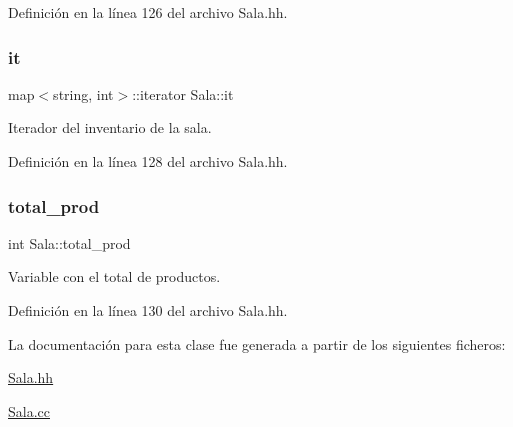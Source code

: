 Definición en la línea 126 del archivo Sala.\+hh.

\mbox{\label{class_sala_a1cc789ab041a9e3011f9eec9357e8fb0}} 
\subsubsection{\texorpdfstring{it}{it}}
{\footnotesize\ttfamily map$<$string, int$>$\+::iterator Sala\+::it\hspace{0.3cm}{\ttfamily [private]}}



Iterador del inventario de la sala. 



Definición en la línea 128 del archivo Sala.\+hh.

\mbox{\label{class_sala_aeb64df257f47ad63fe1ba3b163255e14}} 
\subsubsection{\texorpdfstring{total\+\_\+prod}{total\_prod}}
{\footnotesize\ttfamily int Sala\+::total\+\_\+prod\hspace{0.3cm}{\ttfamily [private]}}



Variable con el total de productos. 



Definición en la línea 130 del archivo Sala.\+hh.



La documentación para esta clase fue generada a partir de los siguientes ficheros\+:\begin{DoxyCompactItemize}
\item 
\hyperlink{_sala_8hh}{Sala.\+hh}\item 
\hyperlink{_sala_8cc}{Sala.\+cc}\end{DoxyCompactItemize}
